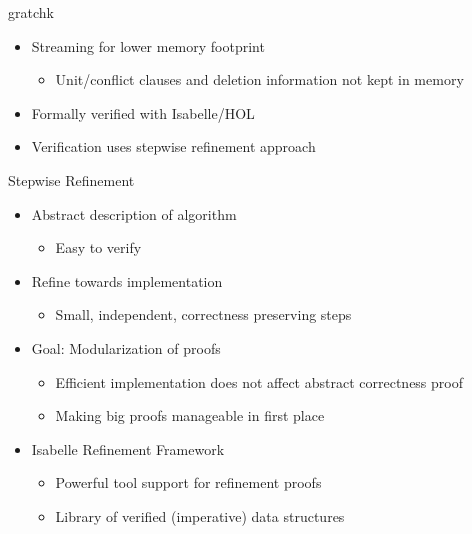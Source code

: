 \documentclass[fleqn]{beamer}
\begin{document}
\begin{frame}{gratchk}
  \begin{itemize}
   \item<+-> Streaming for lower memory footprint
    \begin{itemize}
     \item Unit/conflict clauses and deletion information not kept in memory
    \end{itemize}
   \item<+-> Formally verified with Isabelle/HOL
   \item<+-> Verification uses stepwise refinement approach
    
  \end{itemize}
\end{frame}
\begin{frame}{Stepwise Refinement}
  \begin{itemize}
   \item<+-> Abstract description of algorithm
    \begin{itemize}
     \item Easy to verify
    \end{itemize}
   \item<+-> Refine towards implementation
    \begin{itemize}
     \item Small, independent, correctness preserving steps
    \end{itemize}
   \item<+-> Goal: Modularization of proofs
    \begin{itemize}
     \item Efficient implementation does not affect abstract correctness proof
     \item Making big proofs manageable in first place
    \end{itemize}
   \item<+-> Isabelle Refinement Framework
    \begin{itemize}
     \item Powerful tool support for refinement proofs
     \item Library of verified (imperative) data structures
    
    \end{itemize}
  \end{itemize}
\end{frame}
\end{document}
